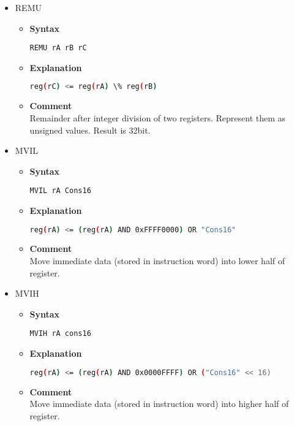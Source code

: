 \begin{itemize}
    \item REMU
    \begin{itemize}
        \item \textbf{Syntax}
        \begin{lstlisting}[language={[markII]Assembler}, frame=single]
    REMU rA rB rC
        \end{lstlisting}
        \item \textbf{Explanation}
        \begin{lstlisting}[language=bash, frame=single]
    reg(rC) <= reg(rA) \% reg(rB)
        \end{lstlisting}
        \item \textbf{Comment} \\
        Remainder after integer division of two registers. Represent them as unsigned values. Result is 32bit.
    \end{itemize}

    \item MVIL
    \begin{itemize}
        \item \textbf{Syntax}
        \begin{lstlisting}[language={[markII]Assembler}, frame=single]
    MVIL rA Cons16
        \end{lstlisting}
        \item \textbf{Explanation}
        \begin{lstlisting}[language=bash, frame=single]
    reg(rA) <= (reg(rA) AND 0xFFFF0000) OR "Cons16"
        \end{lstlisting}
        \item \textbf{Comment} \\
    Move immediate data (stored in instruction word) into lower half of register.
    \end{itemize}

    \item MVIH
    \begin{itemize}
        \item \textbf{Syntax}
        \begin{lstlisting}[language={[markII]Assembler}, frame=single]
    MVIH rA cons16
        \end{lstlisting}
        \item \textbf{Explanation}
        \begin{lstlisting}[language=bash, frame=single]
    reg(rA) <= (reg(rA) AND 0x0000FFFF) OR ("Cons16" << 16)
        \end{lstlisting}
        \item \textbf{Comment} \\
    Move immediate data (stored in instruction word) into higher half of register.
    \end{itemize}


\end{itemize}
